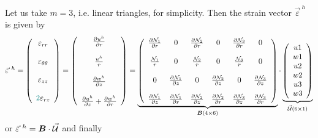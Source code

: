 \noindent Let us take $m=3$, i.e. linear triangles, for simplicity. Then 
the strain vector $\vec{\varepsilon}^{~h}$ is given by
\[
\vec\varepsilon^{~h}=
\left(
\begin{array}{c}
\varepsilon_{rr} \\ \\
\varepsilon_{\theta\theta} \\ \\
\varepsilon_{zz} \\ \\
{\color{teal}2}\varepsilon_{rz}
\end{array}
\right)
=
\left(
\begin{array}{c}
\frac{\partial u^h}{\partial r} \\ \\
\frac{u^h}{r} \\ \\
\frac{\partial w^h}{\partial z} \\ \\
\frac{\partial u^h}{\partial z} + \frac{\partial w^h}{\partial r} 
\end{array}
\right)
=
\underbrace{
\left(
\begin{array}{ccccccccc}
\frac{\partial {\mathcal{N}}_1}{\partial r} &  0 &  
\frac{\partial {\mathcal{N}}_2}{\partial r} &  0 &
\frac{\partial {\mathcal{N}}_3}{\partial r} &  0 \\  \\
\frac{{\mathcal{N}}_1}{r}  & 0 &  
\frac{{\mathcal{N}}_2}{r}  & 0 &
\frac{{\mathcal{N}}_3}{r}  & 0 \\  \\
 0 & \frac{\partial {\mathcal{N}}_1}{\partial z}  &
 0 & \frac{\partial {\mathcal{N}}_2}{\partial z}  &
 0 & \frac{\partial {\mathcal{N}}_3}{\partial z}  \\ \\
\frac{\partial {\mathcal{N}}_1}{\partial z} & \frac{\partial {\mathcal{N}}_1}{\partial r}  &
\frac{\partial {\mathcal{N}}_2}{\partial z} & \frac{\partial {\mathcal{N}}_2}{\partial r}  &
\frac{\partial {\mathcal{N}}_3}{\partial z} & \frac{\partial {\mathcal{N}}_3}{\partial r}   
\end{array}
\right)
}_{\bm B (4\times 6) }
\cdot
\underbrace{
\left(
\begin{array}{c}
u1 \\  w1 \\ u2 \\  w2 \\ u3 \\ w3 
\end{array}
\right)
}_{\vec {\cal U} (6\times1)}
\]
or $\vec{\varepsilon}^{~h}= {\bm B} \cdot \vec{\cal U}$
and finally 
